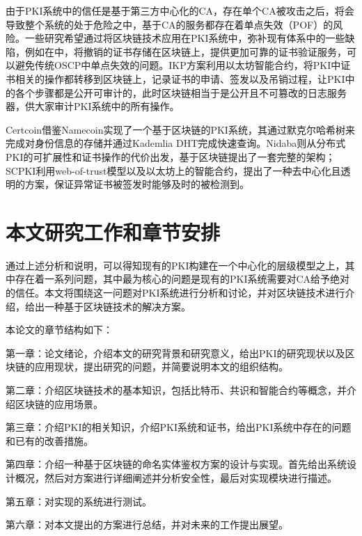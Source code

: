 由于PKI系统中的信任是基于第三方中心化的CA，存在单个CA被攻击之后，将会导致整个系统的处于危险之中，基于CA的服务都存在着单点失效（POF）的风险。一些研究希望通过将区块链技术应用在PKI系统中，弥补现有体系中的一些缺陷，例如在\parencite{baldi2017certificate}中，将撤销的证书存储在区块链上，提供更加可靠的证书验证服务，可以避免传统OSCP中单点失效的问题。IKP\supercite{matsumoto2016ikp}方案利用以太坊智能合约，将PKI中证书相关的操作都转移到区块链上，记录证书的申请、签发以及吊销过程，让PKI中的各个步骤都是公开可审计的，此时区块链相当于是公开且不可篡改的日志服务器，供大家审计PKI系统中的所有操作。



Certcoin\supercite{fromknecht2014decentralized}借鉴Namecoin实现了一个基于区块链的PKI系统，其通过默克尔哈希树来完成对身份信息的存储并通过Kademlia DHT完成快速查询。Nidaba\supercite{rystsovnidaba}则从分布式PKI的可扩展性和证书操作的代价出发，基于区块链提出了一套完整的架构；SCPKI\supercite{al2017scpki}利用web-of-trust模型以及以太坊上的智能合约，提出了一种去中心化且透明的方案，保证异常证书被签发时能够及时的被检测到。



\section{本文研究工作和章节安排}


通过上述分析和说明，可以得知现有的PKI构建在一个中心化的层级模型之上，其中存在着一系列问题，其中最为核心的问题是现有的PKI系统需要对CA给予绝对的信任。本文将围绕这一问题对PKI系统进行分析和讨论，并对区块链技术进行介绍，给出一种基于区块链技术的解决方案。




本论文的章节结构如下：

第一章：论文绪论，介绍本文的研究背景和研究意义，给出PKI的研究现状以及区块链的应用现状，提出研究的问题，并简要说明本文的组织结构。

第二章：介绍区块链技术的基本知识，包括比特币、共识和智能合约等概念，并介绍区块链的应用场景。

第三章：介绍PKI的相关知识，介绍PKI系统和证书，给出PKI系统中存在的问题和已有的改善措施。

第四章：介绍一种基于区块链的命名实体鉴权方案的设计与实现。首先给出系统设计概况，然后对方案进行详细阐述并分析安全性，最后对实现模块进行描述。

第五章：对实现的系统进行测试。

第六章：对本文提出的方案进行总结，并对未来的工作提出展望。



